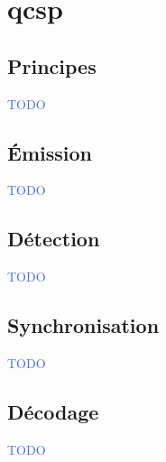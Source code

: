 \documentclass[../main.tex]{subfiles}
\begin{document}
\section{\acrshort{qcsp}}

\subsection{Principes}

\begin{frame}{\subsecname}
  \begin{center}
    \textcolor{RoyalBlue}{TODO}
  \end{center}
\end{frame}

\subsection{Émission}

\begin{frame}{\subsecname}
  \begin{center}
    \textcolor{RoyalBlue}{TODO}
  \end{center}
\end{frame}

\subsection{Détection}

\begin{frame}{\subsecname}
  \begin{center}
    \textcolor{RoyalBlue}{TODO}
  \end{center}
\end{frame}

\subsection{Synchronisation}

\begin{frame}{\subsecname}
  \begin{center}
    \textcolor{RoyalBlue}{TODO}
  \end{center}
\end{frame}

\subsection{Décodage}

\begin{frame}{\subsecname}
  \begin{center}
    \textcolor{RoyalBlue}{TODO}
  \end{center}
\end{frame}
\end{document}
